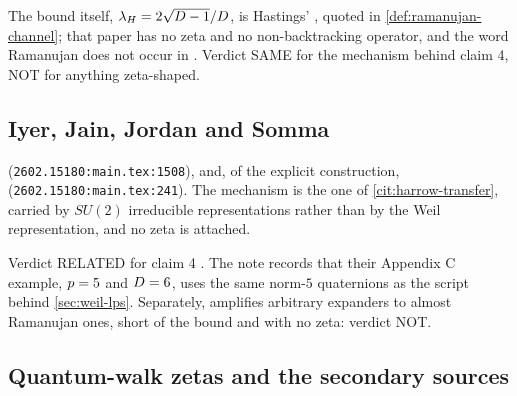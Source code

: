 The bound itself, $\lambda_H = 2\sqrt{D-1}/D$, is Hastings'
\cite{hastings2007random}, quoted in \cref{def:ramanujan-channel}; that paper
has no zeta and no non-backtracking operator, and the word Ramanujan does not
occur in \cite{harrow2008cayley}. Verdict SAME for the mechanism behind claim
4, NOT for anything zeta-shaped.

\subsection{Iyer, Jain, Jordan and Somma}

\begin{citedfact}
\label{cit:iyer-exact-ramanujan}
\sloppy
{\small\texttt{}}
(\texttt{2602.15180:main.tex:1508}), and, of the explicit construction,
{\small\texttt{}}
(\texttt{2602.15180:main.tex:241}). The mechanism is the one of
\cref{cit:harrow-transfer}, carried by $SU(2)$ irreducible representations
rather than by the Weil representation, and no zeta is attached.
\end{citedfact}

Verdict RELATED for claim 4 \cite{iyer2026ramanujan}. The note records that
their Appendix C example, $p = 5$ and $D = 6$, uses the same norm-$5$
quaternions as the script behind \cref{sec:weil-lps}. Separately,
\cite{jeronimo2022almost} amplifies arbitrary expanders to almost Ramanujan
ones, short of the bound and with no zeta: verdict NOT.

\subsection{Quantum-walk zetas and the secondary sources}


